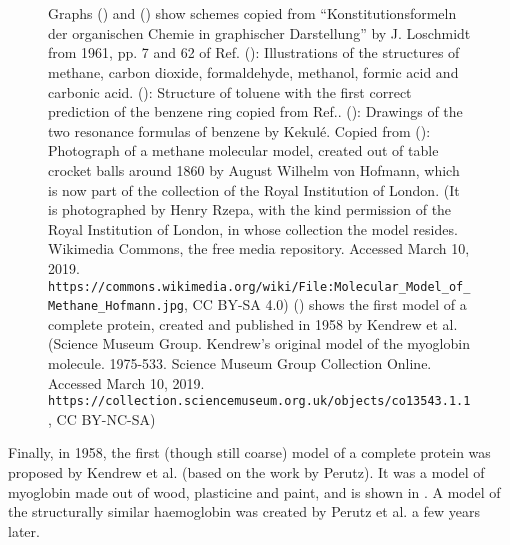 \begin{figure}[!htb]
\centering
\begin{minipage}[t]{.5\textwidth}
%
\end{minipage}%
\begin{minipage}[t]{.5\textwidth}
\\[.2cm]
%
\end{minipage}\\[.2cm]
%
\hfill
{}
\caption{\footnotesize{}
Graphs () and () show schemes copied from ``Konstitutionsformeln der organischen Chemie in graphischer Darstellung'' by J. Loschmidt from 1961, pp. 7 and 62 of Ref.\cite{LO61.1}
 (): Illustrations of the structures of methane, carbon dioxide, formaldehyde, methanol, formic acid and carbonic acid.
 (): Structure of toluene with the first correct prediction of the benzene ring copied from Ref.\cite{KE72.1}.
 (): Drawings of the two resonance formulas of benzene by Kekul\'e. Copied from 
 (): Photograph of a methane molecular model, created out of table crocket balls around 1860 by August Wilhelm von Hofmann, which is now part of the collection of the Royal Institution of London. (It is photographed by Henry Rzepa, with the kind permission of the Royal Institution of London, in whose collection the model resides. Wikimedia Commons, the free media repository. Accessed March 10, 2019. \texttt{https://commons.wikimedia.org/wiki/File:Molecular\_Model\_of\_Methane\_\-Hofmann.jpg}, CC BY-SA 4.0)
 () shows the first model of a complete protein, created and published in 1958 by Kendrew et al.\cite{KE58.1} (Science Museum Group. Kendrew's original model of the myoglobin molecule. 1975-533. Science Museum Group Collection Online. Accessed March 10, 2019. \texttt{https://collection.sciencemuseum.org.uk/objects/co13543.1.1}, CC BY-NC-SA)%
}
\end{figure}


Finally, in 1958, the first (though still coarse) model of a complete protein was proposed
by Kendrew et al.\cite{KE58.1} (based on the work by Perutz). %
 It was a model of myoglobin made out of wood, plasticine and paint, and is shown in . A model of the structurally similar haemoglobin was created by Perutz et al. a few years later.\cite{PE60.1}


